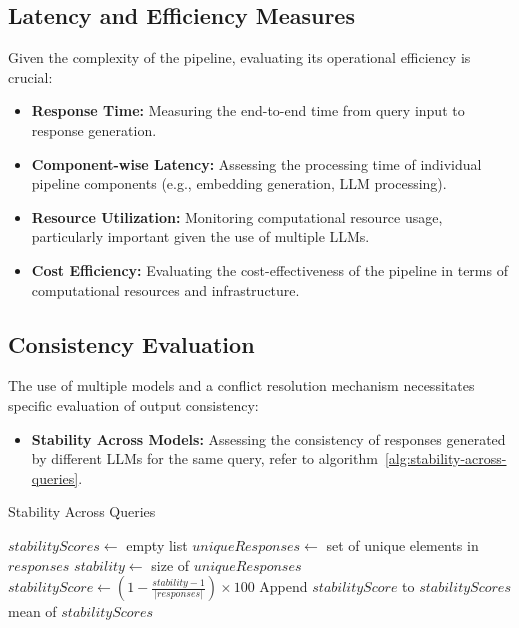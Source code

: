 \subsection{Latency and Efficiency Measures}\label{subsec:latency-and-efficiency-measures}
Given the complexity of the pipeline, evaluating its operational efficiency is crucial:
\begin{itemize}
    \item \textbf{Response Time:} Measuring the end-to-end time from query input to response generation.
    \item \textbf{Component-wise Latency:} Assessing the processing time of individual pipeline components (e.g., embedding generation, LLM processing).
    \item \textbf{Resource Utilization:} Monitoring computational resource usage, particularly important given the use of multiple LLMs.
    \item \textbf{Cost Efficiency:} Evaluating the cost-effectiveness of the pipeline in terms of computational resources and infrastructure.
\end{itemize}

\subsection{Consistency Evaluation}\label{subsec:consistency-and-coherence-evaluation}
The use of multiple models and a conflict resolution mechanism necessitates specific evaluation of output consistency:

\begin{itemize}
    \item \textbf{Stability Across Models:} Assessing the consistency of responses generated by different LLMs for the same query, refer to algorithm~\ref{alg:stability-across-queries}.
\end{itemize}

\begin{algorithm}
    \caption{Stability Across Queries}
    \begin{algorithmic}[1]
            \State $stabilityScores \gets$ empty list
                \State $uniqueResponses \gets$ set of unique elements in $responses$
                \State $stability \gets$ size of $uniqueResponses$
                \State $stabilityScore \gets (1 - \frac{stability - 1}{|responses|}) \times 100$
                \State Append $stabilityScore$ to $stabilityScores$
                    \State \Return mean of $stabilityScores$
                \Else
                    \State {}
                \EndIf
                \EndFor
        \EndProcedure
    \end{algorithmic}\label{alg:stability-across-queries}
\end{algorithm}

